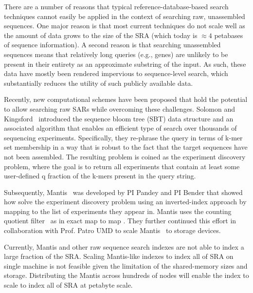 There are a number of reasons that typical reference-database-based search techniques cannot easily be applied in the context of searching raw, unassembled sequences. One major reason is that most current techniques do not scale well as the amount of data grows to the size of the SRA (which today is $\approx4$ petabases of sequence information). A second reason is that searching unassembled sequences means that relatively long queries (e.g., genes) are unlikely to be present in their entirety as an approximate substring of the input.
As such, these data have mostly been rendered impervious to sequence-level search, which substantially reduces the utility of such publicly available data.

Recently, new computational schemes have been proposed
that hold the potential to allow searching raw SARs while overcoming these challenges. Solomon and Kingsford~\cite{solomon2016fast} introduced the sequence bloom tree (SBT) data structure and an associated algorithm that enables an efficient type of search over thousands of sequencing experiments. Specifically, they re-phrase the query in terms of k-mer set membership in a way that is robust to the fact that the target sequences have not been assembled. The resulting problem is coined as the experiment discovery problem, where the goal is to return all experiments that contain at least some user-defined q fraction of the k-mers present in the query string.

Subsequently, Mantis~\cite{PandeyABFJP18Cell} was developed by PI Pandey and PI Bender that showed how solve the experiment discovery problem using an inverted-index approach by mapping \kmers to the list of experiments they appear in. Mantis uses the counting quotient filter~\cite{PandeyBJP17} as in exact map to map \kmers. They further continued this effort in collaboration with Prof. Patro UMD to scale Mantis~\cite{AlmodaresiPFJP19,AlmodaresiPFJP20} to storage devices. 


\begin{rproblem}
Currently, Mantis and other raw sequence search indexes are not able to index a large fraction of the SRA. Scaling Mantis-like indexes to index all of SRA on single machine is not feasible given the limitation of the shared-memory sizes and storage. Distributing the Mantis across hundreds of nodes will enable the index to scale to index all of SRA at petabyte scale.
\label{rprob:peppermint}
\end{rproblem}

